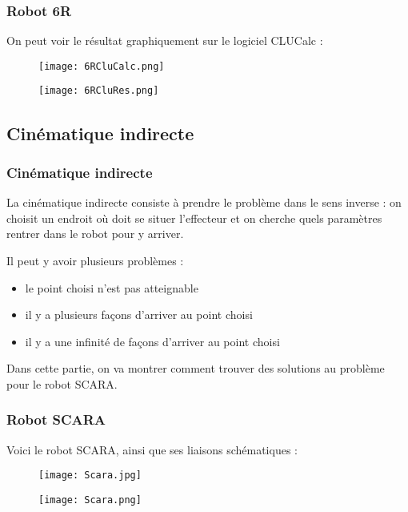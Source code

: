 \documentclass{beamer}
\begin{document}
\begin{frame}
\frametitle{Robot 6R}
On peut voir le résultat graphiquement sur le logiciel CLUCalc : 

\begin{figure}[!ht]
    \begin{minipage}[c]{.46\linewidth}
        \centering
        \texttt{[image: 6RCluCalc.png]}
    \end{minipage}
    \hfill%
    \begin{minipage}[c]{.46\linewidth}
        \hspace*{-1.5cm}
        \texttt{[image: 6RCluRes.png]}
    \end{minipage}
\end{figure}
\end{frame}


\subsection{Cinématique indirecte}

\begin{frame}
\frametitle{Cinématique indirecte}
La cinématique indirecte consiste à prendre le problème dans le sens inverse : on choisit un endroit où doit se situer l'effecteur et on cherche quels paramètres rentrer dans le robot pour y arriver.\bigskip \pause

Il peut y avoir plusieurs problèmes : 
\begin{itemize}
\item le point choisi n'est pas atteignable
\item il y a plusieurs façons d'arriver au point choisi 
\item il y a une infinité de façons d'arriver au point choisi
\end{itemize}
\pause
Dans cette partie, on va montrer comment trouver des solutions au problème pour le robot SCARA.

\end{frame}

\begin{frame}
\frametitle{Robot SCARA}

Voici le robot SCARA, ainsi que ses liaisons schématiques : 

\begin{figure}[!ht]
    \begin{minipage}[c]{.46\linewidth}
        \centering
        \texttt{[image: Scara.jpg]}
    \end{minipage}
    \hfill%
    \begin{minipage}[c]{.46\linewidth}
        \centering
        \texttt{[image: Scara.png]}
    \end{minipage}
\end{figure}

\end{frame}
\end{document}
